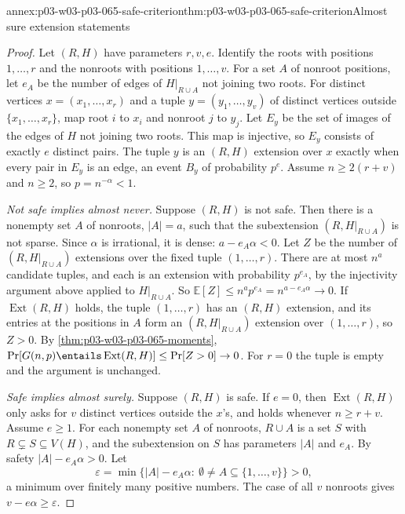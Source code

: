 \begin{annexitem}{annex:p03-w03-p03-065-safe-criterion}{thm:p03-w03-p03-065-safe-criterion}{Almost sure extension statements}
\begin{proof}
Let \((R,H)\) have parameters \(r,v,e\).  Identify the roots with positions
\(1,\ldots,r\) and the nonroots with positions \(1,\ldots,v\).  For a set
\(A\) of nonroot positions, let \(e_A\) be the number of edges of
\(H|_{R\cup A}\) not joining two roots.  For distinct vertices
\(x=(x_1,\ldots,x_r)\) and a tuple \(y=(y_1,\ldots,y_v)\) of distinct
vertices outside \(\{x_1,\ldots,x_r\}\), map root \(i\) to \(x_i\) and
nonroot \(j\) to \(y_j\).  Let \(E_y\) be the set of images of the edges of
\(H\) not joining two roots.  This map is injective, so \(E_y\) consists of
exactly \(e\) distinct pairs.  The tuple \(y\) is an \((R,H)\) extension
over \(x\) exactly when every pair in \(E_y\) is an edge, an event \(B_y\) of
probability \(p^e\).  Assume \(n\geq2(r+v)\) and \(n\geq2\), so
\(p=n^{-\alpha}<1\).

\emph{Not safe implies almost never.}  Suppose \((R,H)\) is not safe.  Then
there is a nonempty set \(A\) of nonroots, \(|A|=a\), such that the
subextension \((R,H|_{R\cup A})\) is not sparse.  Since \(\alpha\) is
irrational, it is dense: \(a-e_A\alpha<0\).  Let \(Z\) be the number of
\((R,H|_{R\cup A})\) extensions over the fixed tuple \((1,\ldots,r)\).  There
are at most \(n^a\) candidate tuples, and each is an extension with
probability \(p^{e_A}\), by the injectivity argument above applied to
\(H|_{R\cup A}\).  So \(\mathbb E[Z]\leq n^ap^{e_A}=n^{a-e_A\alpha}\to0\).
If \(\operatorname{Ext}(R,H)\) holds, the tuple \((1,\ldots,r)\) has an
\((R,H)\) extension, and its entries at the positions in \(A\) form an
\((R,H|_{R\cup A})\) extension over \((1,\ldots,r)\), so \(Z>0\).  By
\cref{thm:p03-w03-p03-065-moments},
\(\Pr[G(n,p)\entails\operatorname{Ext}(R,H)]\leq\Pr[Z>0]\to0\).  For
\(r=0\) the tuple is empty and the argument is unchanged.

\emph{Safe implies almost surely.}  Suppose \((R,H)\) is safe.  If \(e=0\),
then \(\operatorname{Ext}(R,H)\) only asks for \(v\) distinct vertices
outside the \(x\)'s, and holds whenever \(n\geq r+v\).  Assume \(e\geq1\).
For each nonempty set \(A\) of nonroots, \(R\cup A\) is a set \(S\) with
\(R\subsetneq S\subseteq V(H)\), and the subextension on \(S\) has
parameters \(|A|\) and \(e_A\).  By safety \(|A|-e_A\alpha>0\).  Let
\[
  \varepsilon=\min\{|A|-e_A\alpha:\ \emptyset\neq A\subseteq\{1,\ldots,v\}\}>0,
\]
a minimum over finitely many positive numbers.  The case of all \(v\)
nonroots gives \(v-e\alpha\geq\varepsilon\).


\end{proof}
\end{annexitem}
